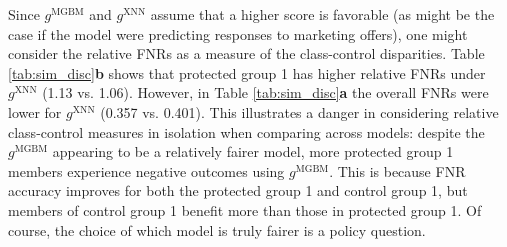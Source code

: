 \documentclass[information,article,submit,moreauthors,pdftex]{definitions/mdpi}
\begin{document}
Since $g^{\text{MGBM}}$ and $g^{\text{XNN}}$ assume that a higher score is favorable (as might be the case if the model were predicting responses to marketing offers), one might consider the relative FNRs as a measure of the class-control disparities. Table \ref{tab:sim_disc}\textbf{b} shows that protected group 1 has higher relative FNRs under $g^{\text{XNN}}$ (1.13 vs. 1.06).  However, in Table \ref{tab:sim_disc}\textbf{a}  the overall FNRs were lower for  $g^{\text{XNN}}$ (0.357 vs. 0.401). This illustrates a danger in considering relative class-control measures in isolation when comparing across models: despite the $g^\text{MGBM}$ appearing to be a relatively fairer model, more protected group 1 members experience negative outcomes using $g^{\text{MGBM}}$. This is because FNR accuracy improves for both the protected group 1 and control group 1, but members of control group 1 benefit more than those in protected group 1.  Of course, the choice of which model is truly fairer is a policy question.
\end{document}
